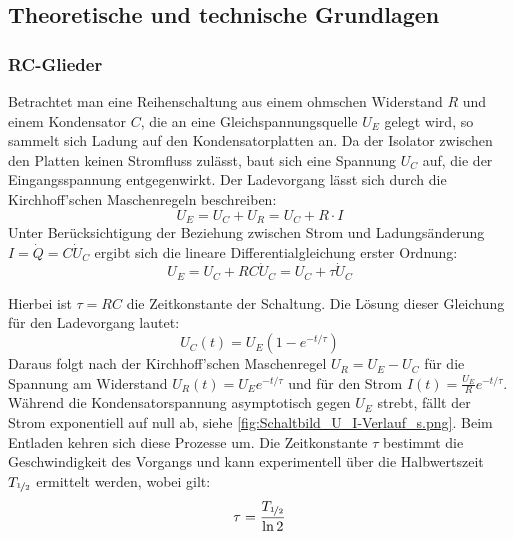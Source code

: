 \newpage

\subsection[Theoretische und technische Grundlagen]{Theoretische und technische Grundlagen \protect\autocite{Skript_2.2}}

\subsubsection{RC-Glieder}
Betrachtet man eine Reihenschaltung aus einem ohmschen Widerstand \(R\) und einem Kondensator \(C\), die an eine Gleichspannungsquelle \(U_E\) gelegt wird, so sammelt sich Ladung auf den Kondensatorplatten an. Da der Isolator zwischen den Platten keinen Stromfluss zulässt, baut sich eine Spannung \(U_C\) auf, die der Eingangsspannung entgegenwirkt. Der Ladevorgang lässt sich durch die Kirchhoff'schen Maschenregeln beschreiben:
\begin{equation} \label{eq:rc_kirchhoff} U_E = U_C + U_R = U_C + R \cdot I \end{equation}
Unter Berücksichtigung der Beziehung zwischen Strom und Ladungsänderung \(I = \dot{Q} = C \dot{U}_C\) ergibt sich die lineare Differentialgleichung erster Ordnung:
\begin{equation} \label{eq:rc_diffgl} U_E = U_C + R C \dot{U}_C = U_C + \tau \dot{U}_C \end{equation}


Hierbei ist \(\tau = RC\) die Zeitkonstante der Schaltung. Die Lösung dieser Gleichung für den Ladevorgang lautet:
\begin{equation} \label{eq:rc_laden} U_C(t) = U_E \left(1 - e^{-t/\tau}\right) \end{equation}
Daraus folgt nach der Kirchhoff'schen Maschenregel \(U_R=U_E-U_C\) für die Spannung am Widerstand \(U_R(t) = U_E e^{-t/\tau}\) und für den Strom \(I(t) = \frac{U_E}{R} e^{-t/\tau}\). Während die Kondensatorspannung asymptotisch gegen \(U_E\) strebt, fällt der Strom exponentiell auf null ab, siehe \cref{fig:Schaltbild_U_I-Verlauf_s.png}. Beim Entladen kehren sich diese Prozesse um. Die Zeitkonstante \(\tau\) bestimmt die Geschwindigkeit des Vorgangs und kann experimentell über die Halbwertszeit \(T_{\nicefrac{1}{2}}\) ermittelt werden, wobei gilt:
\begin{equation} \label{eq:rc_halbwertszeit} \tau = \frac{T_{\nicefrac{1}{2}}}{\ln 2} \end{equation}


